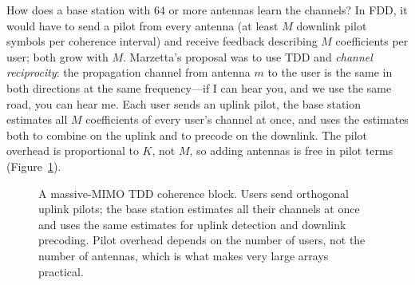 How does a base station with 64 or more antennas learn the channels? In FDD, it would have to send
a pilot from every antenna (at least $M$ downlink pilot symbols per coherence interval) and receive
feedback describing $M$ coefficients per user; both grow with $M$. Marzetta's proposal was to use
TDD and \emph{channel reciprocity}: the propagation channel from antenna $m$ to the user is the same
in both directions at the same frequency---if I can hear you, and we use the same road, you can hear
me. Each user sends an uplink pilot, the base station estimates all $M$ coefficients of every user's
channel at once, and uses the estimates both to combine on the uplink and to precode on the
downlink. The pilot overhead is proportional to $K$, not $M$, so adding antennas is free in pilot
terms (Figure~\ref{fig:ch19_tdd}).

\begin{figure}[htbp]\centering
{}
\caption{A massive-MIMO TDD coherence block. Users send orthogonal uplink pilots; the base station
estimates all their channels at once and uses the same estimates for uplink detection and downlink
precoding. Pilot overhead depends on the number of users, not the number of antennas, which is what
makes very large arrays practical.}
\label{fig:ch19_tdd}
\end{figure}


